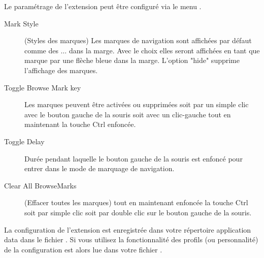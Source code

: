 Le paramétrage de l'extension peut être configuré via le menu .


\begin{description}
\item[Mark Style] (Styles des marques) Les marques de navigation sont affichées par défaut comme des $\ldots$ dans la marge. Avec le choix  elles seront affichées en tant que marque par une flèche bleue dans la marge. L'option "hide" supprime l'affichage des marques.
\item[Toggle Browse Mark key] Les marques peuvent être activées ou supprimées soit par un simple clic avec le bouton gauche de la souris soit avec un clic-gauche tout en maintenant la touche Ctrl enfoncée.
\item[Toggle Delay] Durée pendant laquelle le bouton gauche de la souris est enfoncé pour entrer dans le mode de marquage de navigation.
\item[Clear All BrowseMarks] (Effacer toutes les marques) tout en maintenant enfoncée la touche Ctrl soit par simple clic soit par double clic sur le bouton gauche de la souris.
\end{description}

La configuration de l'extension est enregistrée dans votre répertoire application data dans le fichier . Si vous utilisez la fonctionnalité des profils (ou personnalité) de \codeblocks la configuration est alors lue dans votre fichier .







